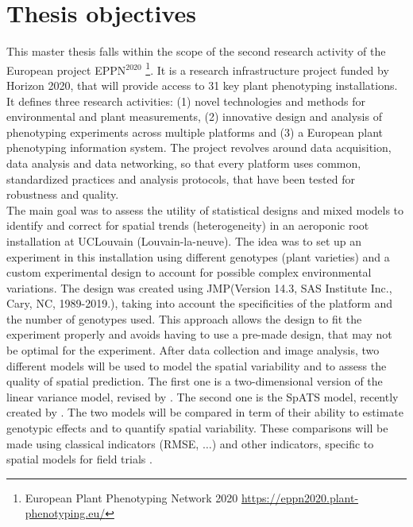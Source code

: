 \section{Thesis objectives}
This master thesis falls within the scope of the second research activity of the European project EPPN$^{2020}$ \footnote{European Plant Phenotyping Network 2020 \url{https://eppn2020.plant-phenotyping.eu/}}. It is a research infrastructure project funded by  Horizon 2020, that will provide access to 31 key plant phenotyping installations. It defines three research activities: (1) novel technologies and methods for environmental and plant measurements, (2) innovative design and analysis of phenotyping experiments across multiple
platforms and (3) a European plant phenotyping information system. The project revolves around data acquisition, data analysis and data networking, so that every platform uses common, standardized practices and analysis protocols, that have been tested for robustness and quality.\\

The main goal was to assess the utility of statistical designs and mixed models to identify and correct for spatial trends (heterogeneity) in an aeroponic root installation at UCLouvain (Louvain-la-neuve). The idea was to set up an experiment in this installation using different genotypes (plant varieties) and a custom experimental design to account for possible complex environmental variations. The design was created using JMP\textregistered  (Version 14.3, SAS Institute Inc., Cary, NC, 1989-2019.), taking into account the specificities of the platform and the number of genotypes used. This approach allows the design to fit the experiment properly and avoids having to use a pre-made design, that may not be optimal for the experiment.
After data collection and image analysis, two different models will be used to model the spatial variability and to assess the quality of spatial prediction. The first one is a two-dimensional version of the linear variance model, revised by \textcite{piepho_linear_2010}. The second one is the SpATS model, recently created by \textcite{rodriguez-alvarez_correcting_2018}. 
The two models will be compared in term of their ability to estimate genotypic effects and to quantify spatial variability. These comparisons will be made using classical indicators (RMSE, $\ldots$) and other indicators, specific to spatial models for field trials \parencite{oakey_joint_2006}.\\

